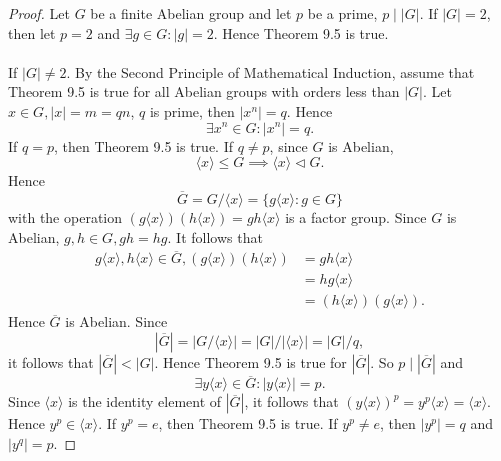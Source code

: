 \documentclass{article}
\theoremstyle{definition}
\begin{document}
        \begin{proof}
           Let $G$ be a finite Abelian group and let $p$ be a prime, $p \mid |G|$. If $|G|=2$, then let $p = 2$ and $\exists g \in G: |g|=2$. Hence Theorem 9.5 is true.
           \\ \\
           If $|G| \neq 2$. By the Second Principle of Mathematical Induction, assume that Theorem 9.5 is true for all Abelian groups with orders less than $|G|$. Let $x \in G, |x| = m = qn$, $q$ is prime, then $|x^n| = q$. Hence
           \begin{equation*}
               \exists x^n \in G: |x^n| = q.
           \end{equation*}
           If $q=p$, then Theorem 9.5 is true. If $q \neq p$, since $G$ is Abelian,
           \begin{equation*}
               \langle x \rangle \leq G \implies \langle x \rangle \lhd G.
           \end{equation*}
           Hence
           \begin{equation*}
               \overline{G} = G/\langle x \rangle = \{g\langle x \rangle: g \in G\}
           \end{equation*}
           with the operation $(g\langle x \rangle)(h\langle x \rangle) = gh\langle x \rangle$ is a factor group. Since $G$ is Abelian, $g,h \in G, gh=hg$. It follows that
           \begin{align*}
               g\langle x \rangle, h\langle x \rangle \in \overline{G}, (g\langle x \rangle)(h\langle x \rangle) &= gh\langle x \rangle \\
               &= hg \langle x \rangle \\
               &= (h\langle x \rangle)(g\langle x \rangle).
           \end{align*}
           Hence $\overline{G}$ is Abelian. Since
           \begin{equation*}
               |\overline{G}| = |G/\langle x \rangle| = |G|/|\langle x \rangle| = |G|/q,
           \end{equation*}
           it follows that $|\overline{G}| < |G|$. Hence Theorem 9.5 is true for $|\overline{G}|$. So $p \mid |\overline{G}|$ and
           \begin{equation*}
               \exists y\langle x \rangle \in \overline{G}: |y\langle x \rangle| = p.
           \end{equation*}
           Since $\langle x \rangle$ is the identity element of $|\overline{G}|$, it follows that $(y\langle x \rangle)^p = y^p\langle x \rangle = \langle x \rangle$. Hence $y^p \in \langle x \rangle$. If $y^p = e$, then Theorem 9.5 is true. If $y^p \neq e$, then $|y^p| = q$ and $|y^q| = p$.
        \end{proof}
        
\end{document}

